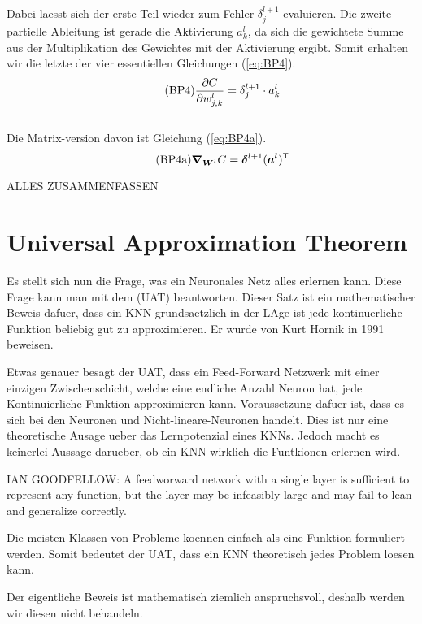 \\
Dabei laesst sich der erste Teil wieder zum Fehler $\delta_j^{l+1}$ evaluieren.
Die zweite partielle Ableitung ist gerade die Aktivierung $a_k^l$, da sich die
gewichtete Summe aus der Multiplikation des Gewichtes mit der Aktivierung ergibt.
Somit erhalten wir die letzte der vier essentiellen Gleichungen (\ref{eq:BP4}).
\begin{equation}\tag{BP4}\label{eq:BP4}
  \frac{\partial C}{\partial w_{j,k}^l} = \delta_j^{l+1} \cdot a_k^l
\end{equation}
\\
Die Matrix-version davon ist Gleichung (\ref{eq:BP4a}).
\begin{equation}\tag{BP4a}\label{eq:BP4a}
  \bm{\nabla}_{\bm{W}^l} C = \bm{\delta}^{l+1} (\bm{a^l})^{\mathsf{T}}
\end{equation}

ALLES ZUSAMMENFASSEN

\cite{Nielsen}


\section{Universal Approximation Theorem}\label{sec:UAT}
Es stellt sich nun die Frage, was ein Neuronales Netz alles erlernen kann.
Diese Frage kann man mit dem  (UAT)
beantworten. Dieser Satz ist ein mathematischer Beweis dafuer, dass ein KNN
grundsaetzlich in der LAge ist jede kontinuerliche Funktion beliebig gut zu
approximieren. Er wurde von Kurt Hornik in 1991 beweisen.

Etwas genauer besagt der UAT, dass ein Feed-Forward Netzwerk mit einer einzigen
Zwischenschicht, welche eine endliche Anzahl Neuron hat, jede Kontinuierliche
Funktion approximieren kann. Voraussetzung dafuer ist, dass es sich bei den
Neuronen und Nicht-lineare-Neuronen handelt. Dies ist nur eine theoretische
Ausage ueber das Lernpotenzial eines KNNs. Jedoch macht es keinerlei Aussage
darueber, ob ein KNN wirklich die Funtkionen erlernen wird.

IAN GOODFELLOW:
A feedworward network with a single layer is sufficient to represent any
function, but the layer may be infeasibly large and may fail to lean and
generalize correctly.

Die meisten Klassen von Probleme koennen einfach als eine Funktion formuliert
werden. Somit bedeutet der UAT, dass ein KNN theoretisch jedes Problem loesen kann.

Der eigentliche Beweis ist mathematisch ziemlich anspruchsvoll, deshalb werden
wir diesen nicht behandeln.

